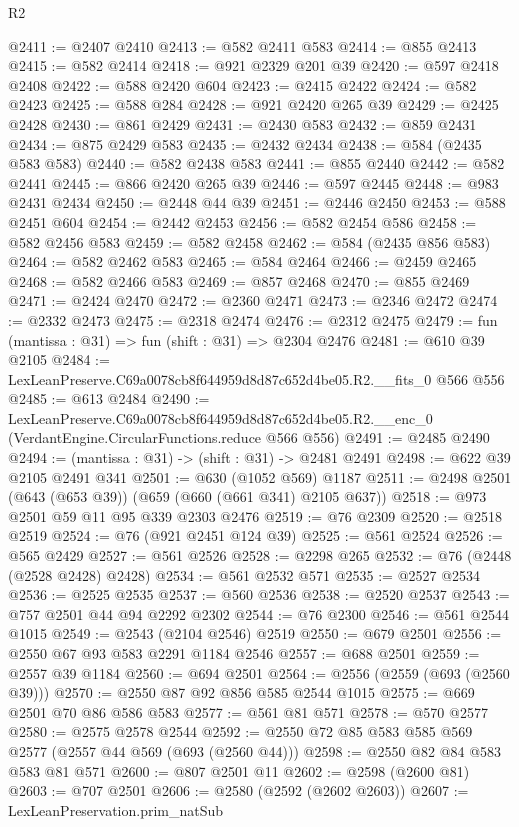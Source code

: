\begin{lexlean}{R2}
\begin{coremodule}
@2411 := @2407 @2410
@2413 := @582 @2411 @583
@2414 := @855 @2413
@2415 := @582 @2414
@2418 := @921 @2329 @201 @39
@2420 := @597 @2418 @2408
@2422 := @588 @2420 @604
@2423 := @2415 @2422
@2424 := @582 @2423
@2425 := @588 @284
@2428 := @921 @2420 @265 @39
@2429 := @2425 @2428
@2430 := @861 @2429
@2431 := @2430 @583
@2432 := @859 @2431
@2434 := @875 @2429 @583
@2435 := @2432 @2434
@2438 := @584 (@2435 @583 @583)
@2440 := @582 @2438 @583
@2441 := @855 @2440
@2442 := @582 @2441
@2445 := @866 @2420 @265 @39
@2446 := @597 @2445
@2448 := @983 @2431 @2434
@2450 := @2448 @44 @39
@2451 := @2446 @2450
@2453 := @588 @2451 @604
@2454 := @2442 @2453
@2456 := @582 @2454 @586
@2458 := @582 @2456 @583
@2459 := @582 @2458
@2462 := @584 (@2435 @856 @583)
@2464 := @582 @2462 @583
@2465 := @584 @2464
@2466 := @2459 @2465
@2468 := @582 @2466 @583
@2469 := @857 @2468
@2470 := @855 @2469
@2471 := @2424 @2470
@2472 := @2360 @2471
@2473 := @2346 @2472
@2474 := @2332 @2473
@2475 := @2318 @2474
@2476 := @2312 @2475
@2479 := fun (mantissa : @31) => fun (shift : @31) => @2304 @2476
@2481 := @610 @39 @2105
@2484 := LexLeanPreserve.C69a0078cb8f644959d8d87c652d4be05.R2.__fits_0 @566 @556
@2485 := @613 @2484
@2490 := LexLeanPreserve.C69a0078cb8f644959d8d87c652d4be05.R2.__enc_0
    (VerdantEngine.CircularFunctions.reduce @566 @556)
@2491 := @2485 @2490
@2494 := (mantissa : @31) -> (shift : @31) -> @2481 @2491
@2498 := @622 @39 @2105 @2491 @341
@2501 := @630 (@1052 @569) @1187
@2511 := @2498 @2501 (@643 (@653 @39)) (@659 (@660 (@661 @341) @2105 @637))
@2518 := @973 @2501 @59 @11 @95 @339 @2303 @2476
@2519 := @76 @2309
@2520 := @2518 @2519
@2524 := @76 (@921 @2451 @124 @39)
@2525 := @561 @2524
@2526 := @565 @2429
@2527 := @561 @2526
@2528 := @2298 @265
@2532 := @76 (@2448 (@2528 @2428) @2428)
@2534 := @561 @2532 @571
@2535 := @2527 @2534
@2536 := @2525 @2535
@2537 := @560 @2536
@2538 := @2520 @2537
@2543 := @757 @2501 @44 @94 @2292 @2302
@2544 := @76 @2300
@2546 := @561 @2544 @1015
@2549 := @2543 (@2104 @2546) @2519
@2550 := @679 @2501
@2556 := @2550 @67 @93 @583 @2291 @1184 @2546
@2557 := @688 @2501
@2559 := @2557 @39 @1184
@2560 := @694 @2501
@2564 := @2556 (@2559 (@693 (@2560 @39)))
@2570 := @2550 @87 @92 @856 @585 @2544 @1015
@2575 := @669 @2501 @70 @86 @586 @583
@2577 := @561 @81 @571
@2578 := @570 @2577
@2580 := @2575 @2578 @2544
@2592 := @2550 @72 @85 @583 @585 @569 @2577 (@2557 @44 @569 (@693 (@2560 @44)))
@2598 := @2550 @82 @84 @583 @583 @81 @571
@2600 := @807 @2501 @11
@2602 := @2598 (@2600 @81)
@2603 := @707 @2501
@2606 := @2580 (@2592 (@2602 @2603))
@2607 := LexLeanPreservation.prim_natSub

\end{coremodule}
\end{lexlean}
